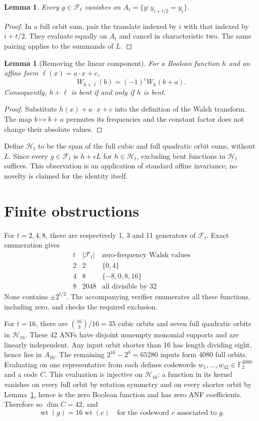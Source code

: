 \documentclass[11pt,a4paper]{article}
\newtheorem{lemma}[theorem]{Lemma}
\newcommand{\F}{\mathbb F_2}
\newcommand{\wt}{\operatorname{wt}}
\begin{document}
\begin{lemma}\label{lem:vanishing}
Every $g\in\mathcal F_t$ vanishes on $A_t=\{y:y_{i+t/2}=y_i\}$.
\end{lemma}
\begin{proof}
In a full orbit sum, pair the translate indexed by $i$ with that indexed by $i+t/2$. They evaluate equally on $A_t$ and cancel in characteristic two. The same pairing applies to the summands of $L$.
\end{proof}


\begin{lemma}[Removing the linear component]\label{lem:linear}
For a Boolean function $h$ and an affine form $\ell(x)=a\cdot x+c$,
\[W_{h+\ell}(b)=(-1)^c W_h(b+a).\]
Consequently, $h+\ell$ is bent if and only if $h$ is bent.
\end{lemma}
\begin{proof}
Substitute $h(x)+a\cdot x+c$ into the definition of the Walsh transform.
The map $b\mapsto b+a$ permutes its frequencies and the constant factor
does not change their absolute values.
\end{proof}
Define $\mathcal H_t$ to be the span of the full cubic and full quadratic
orbit sums, without $L$. Since every $g\in\mathcal F_t$ is $h+\epsilon L$
for $h\in\mathcal H_t$, excluding bent functions in $\mathcal H_t$ suffices.
This observation is an application of standard affine invariance; no
novelty is claimed for the identity itself.

\section{Finite obstructions}
For $t=2,4,8$, there are respectively 1, 3 and 11 generators of $\mathcal F_t$. Exact enumeration gives
\[
\begin{array}{c|c|c}
t & |\mathcal F_t| & \text{zero-frequency Walsh values}\\\hline
2&2&\{0,4\}\\
4&8&\{-8,0,8,16\}\\
8&2048&\text{all divisible by }32
\end{array}
\]
None contains $\pm2^{t/2}$. The accompanying verifier enumerates all these functions, including zero, and checks the required exclusion.

For $t=16$, there are $\binom{16}{3}/16=35$ cubic orbits and seven full quadratic orbits in $\mathcal H_{16}$. These 42 ANFs have disjoint nonempty monomial supports and are linearly independent. Any input orbit shorter than 16 has length dividing eight, hence lies in $A_{16}$. The remaining $2^{16}-2^8=65280$ inputs form 4080 full orbits. Evaluating on one representative from each defines codewords $w_1,\ldots,w_{42}\in\F^{4080}$ and a code $C$. This evaluation is injective on $\mathcal H_{16}$: a function in its kernel vanishes on every full orbit by rotation symmetry and on every shorter orbit by Lemma~\ref{lem:vanishing}, hence is the zero Boolean function and has zero ANF coefficients. Therefore so $\dim C=42$, and
\begin{equation}\label{eq:weights}
\wt(g)=16\wt(c)\quad\text{for the codeword }c\text{ associated to }g.
\end{equation}
\end{document}
